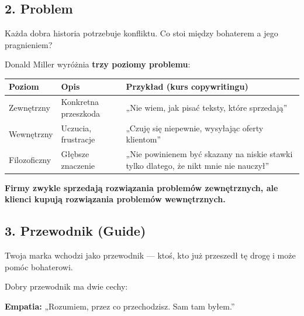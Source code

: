 \documentclass[
  12pt,
  a4paper,
  twoside,
  openright,
  12pt,
  DIV=12,
  BCOR=12mm]{scrbook}
\begin{document}
\subsection{2. Problem}\label{problem}

Każda dobra historia potrzebuje konfliktu. Co stoi między bohaterem a
jego pragnieniem?

Donald Miller wyróżnia \textbf{trzy poziomy problemu}:

\begin{longtable}[]{@{}
  >{\raggedright\arraybackslash}p{}
  >{\raggedright\arraybackslash}p{}
  >{\raggedright\arraybackslash}p{}@{}}
\toprule\noalign{}
\begin{minipage}[b]{\linewidth}\raggedright
Poziom
\end{minipage} & \begin{minipage}[b]{\linewidth}\raggedright
Opis
\end{minipage} & \begin{minipage}[b]{\linewidth}\raggedright
Przykład (kurs copywritingu)
\end{minipage} \\
\midrule\noalign{}
\endhead
\bottomrule\noalign{}
\endlastfoot
Zewnętrzny & Konkretna przeszkoda & „Nie wiem, jak pisać teksty, które
sprzedają'' \\
Wewnętrzny & Uczucia, frustracje & „Czuję się niepewnie, wysyłając
oferty klientom'' \\
Filozoficzny & Głębsze znaczenie & „Nie powinienem być skazany na niskie
stawki tylko dlatego, że nikt mnie nie nauczył'' \\
\end{longtable}

\textbf{Firmy zwykle sprzedają rozwiązania problemów zewnętrznych, ale
klienci kupują rozwiązania problemów wewnętrznych.}

\subsection{3. Przewodnik (Guide)}\label{przewodnik-guide}

Twoja marka wchodzi jako przewodnik --- ktoś, kto już przeszedł tę drogę
i może pomóc bohaterowi.

Dobry przewodnik ma dwie cechy:

\textbf{Empatia:} „Rozumiem, przez co przechodzisz. Sam tam byłem.''
\end{document}
